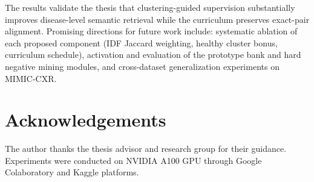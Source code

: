 \documentclass[11pt, a4paper]{article}
\begin{document}
The results validate the thesis that clustering-guided supervision
substantially improves disease-level semantic retrieval while the
curriculum preserves exact-pair alignment.
Promising directions for future work include: systematic ablation of each
proposed component (IDF Jaccard weighting, healthy cluster bonus, curriculum
schedule), activation and evaluation of the prototype bank and hard negative
mining modules, and cross-dataset generalization experiments on MIMIC-CXR.

\section*{Acknowledgements}

The author thanks the thesis advisor and research group for their guidance.
Experiments were conducted on NVIDIA A100 GPU through Google Colaboratory
and Kaggle platforms.
\end{document}
